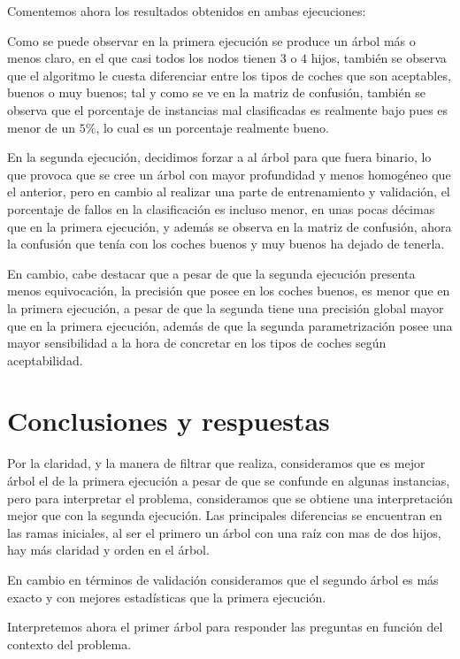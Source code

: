 \documentclass[a4paper, 11pt, twoside, openany, onecolumn, final]{memoir}
\begin{document}
	Comentemos ahora los resultados obtenidos en ambas ejecuciones:
	
	Como se puede observar en la primera ejecución se produce un árbol más o menos claro, en el que casi todos los nodos tienen $3$ o $4$ hijos, también se observa que el algoritmo le cuesta diferenciar entre los tipos de coches que son aceptables, buenos o muy buenos; tal y como se ve en la matriz de confusión, también se observa que el porcentaje de instancias mal clasificadas es realmente bajo pues es menor de un $5\%$, lo cual es un porcentaje realmente bueno.
	
	En la segunda ejecución, decidimos forzar a al árbol para que fuera binario, lo que provoca que se cree un  árbol con mayor profundidad y menos homogéneo que el anterior, pero en cambio al realizar una parte de entrenamiento y validación, el porcentaje de fallos en la clasificación es incluso menor, en unas pocas décimas que en la primera ejecución, y además se observa en la matriz de confusión, ahora la confusión que tenía con los coches buenos y muy buenos ha dejado de tenerla. 
	
	En cambio, cabe destacar que a pesar de que la segunda ejecución presenta menos equivocación, la precisión que posee en los coches buenos, es menor que en la primera ejecución, a pesar de que la segunda tiene una precisión global mayor que en la primera ejecución, además de que la segunda parametrización posee una mayor sensibilidad a la hora de concretar en los tipos de coches según aceptabilidad.
	
	\section{Conclusiones y respuestas}
	Por la claridad, y la manera de filtrar que realiza, consideramos que es mejor árbol el de la primera ejecución a pesar de que se confunde en algunas instancias, pero para interpretar el problema, consideramos que se obtiene una interpretación mejor que con la segunda ejecución. Las principales diferencias se encuentran en las ramas iniciales, al ser el primero un árbol con una raíz con mas de dos hijos, hay más claridad y orden en el árbol. 
	
	En cambio en términos de validación consideramos que el segundo árbol es más exacto y con mejores estadísticas que la primera ejecución.
	
	Interpretemos ahora el primer árbol para responder las preguntas en función del contexto del problema.
	
\end{document}
